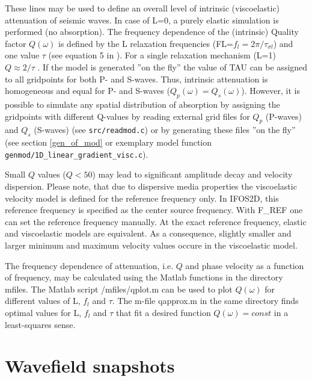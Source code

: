These lines may be used to define an overall level of intrinsic (viscoelastic) attenuation of seismic waves. In case of L=0, a purely elastic simulation is performed (no absorption). The frequency dependence of the (intrinsic) Quality factor $Q(\omega)$ is defined by the L relaxation frequencies (FL=$f_l=2\pi/\tau_{\sigma l}$) and one value $\tau$ (see equation 5 in \cite{bohlen:02}). For a single relaxation mechanism (L=1) $Q \approx 2/\tau$ \citep{bohlen:98,blanch:95,bohlen:02}. If the model is generated ''on the fly'' the value of TAU can be assigned to all gridpoints for both P- and S-waves. Thus, intrinsic attenuation is homogeneous and equal for P- and S-waves ($Q_p(\omega)=Q_s(\omega)$). However, it is possible to simulate any spatial distribution of absorption by assigning the gridpoints with different Q-values by reading external grid files for $Q_p$ (P-waves) and $Q_s$ (S-waves) (see \texttt{src/readmod.c}) or by generating these files ''on the fly'' (see section \ref{gen_of_mod} or exemplary model function \texttt{genmod/1D\_linear\_gradient\_visc.c}).  

Small $Q$ values ($Q<50$) may lead to significant amplitude decay and velocity dispersion. Please note, that due to dispersive media properties the viscoelastic velocity model is defined for the reference frequency only. In IFOS2D, this reference frequency is specified as the center source frequency. With F\_REF one can set the reference frequency manually. At the exact reference frequency, elastic and viscoelastic models are equivalent. As a consequence, slightly smaller and larger minimum and maximum velocity values occure in the viscoelastic model.

The frequency dependence of attenuation, i.e. $Q$ and phase velocity as a function  of frequency, may be calculated using the Matlab functions in the directory mfiles. The Matlab script /mfiles/qplot.m can be used to plot $Q(\omega)$ for different values of L, $f_l$ and $\tau$. The m-file qapprox.m in the same directory finds optimal values for L, $f_l$ and $\tau$ that fit a desired function $Q(\omega)=const$ in a least-squares sense.


\section{Wavefield snapshots}
{\color{blue}{\begin{verbatim}
"Snapshots" : "comment",
			"SNAP" : "0",
			"TSNAP1" : "2.7e-3",
			"TSNAP2" : "6.0",
			"TSNAPINC" : "0.12",
			"IDX" : "1",
			"IDY" : "1",
			"SNAP_FORMAT" : "3",
			"SNAPSHOT_START , SNAPSHOT_END , SNAPSHOT_INCR" : "2, 3 , 2",
			"SNAP_FILE" : "./snap/waveform_forward",
\end{verbatim}}}

